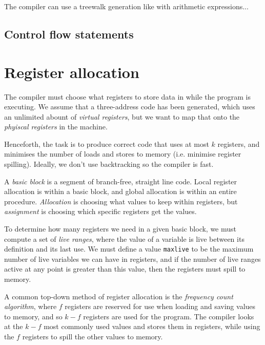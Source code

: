 The compiler can use a treewalk generation like with arithmetic
expressions...


\subsection{Control flow statements}




\section{Register allocation}

The compiler must choose what registers to store data in while the
program is executing. We assume that a three-address code has been
generated, which uses an unlimited abount of \textit{virtual
registers}, but we want to map that onto the \textit{phyiscal
registers} in the machine.

Henceforth, the task is to produce correct code that uses at most $k$
registers, and minimises the number of loads and stores to memory
(i.e. minimise register spilling). Ideally, we don't use backtracking
so the compiler is fast.

A \textit{basic block} is a segment of branch-free,
straight line code. Local register allocation is within a basic block,
and global allocation is within an entire
procedure. \textit{Allocation} is choosing what values to keep within
registers, but \textit{assignment} is choosing which specific
registers get the values.

To determine how many registers we need in a given basic block, we
must compute a set of \textit{live ranges}, where the value of a
variable is live between its definition and its last use. We must
define a value \texttt{maxlive} to be the maximum number of live
variables we can have in registers, and if the number of live ranges
active at any point is greater than this value, then the registers
must spill to memory.

A common top-down method of register allocation is
the \textit{frequency count algorithm}, where $f$ registers are
reserved for use when loading and saving values to memory, and so
$k-f$ registers are used for the program. The compiler looks at the
$k-f$ most commonly used values and stores them in registers, while
using the $f$ registers to spill the other values to memory.

